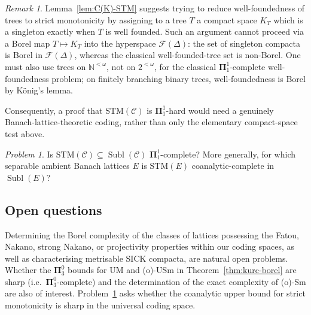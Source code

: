 \documentclass[12pt]{amsart}
\theoremstyle{plain}
\theoremstyle{definition}
\theoremstyle{remark}
\newtheorem{remark}[theorem]{Remark}
\newtheorem{problem}[theorem]{Problem}
\DeclareMathOperator{\Subl}{Subl}
\newcommand{\N}{\mathbb{N}}
\begin{document}
\begin{remark}\label{rem:STM-complete-caution}
Lemma~\ref{lem:C(K)-STM} suggests trying to reduce well-foundedness of trees to
strict monotonicity by assigning to a tree $T$ a compact space $K_T$ which is a
singleton exactly when $T$ is well founded.  Such an argument cannot proceed via
a Borel map $T\mapsto K_T$ into the hyperspace $\mathcal F(\Delta)$: the set of
singleton compacta is Borel in $\mathcal F(\Delta)$, whereas the classical
well-founded-tree set is non-Borel.  One must also use trees on
$\N^{<\omega}$, not on $2^{<\omega}$, for the classical
$\boldsymbol{\Pi}^1_1$-complete well-foundedness problem; on finitely branching
binary trees, well-foundedness is Borel by K\"onig's lemma.

Consequently, a proof that $\mathrm{STM}(\mathcal C)$ is
$\boldsymbol{\Pi}^1_1$-hard would need a genuinely Banach-lattice-theoretic
coding, rather than only the elementary compact-space test above.
\end{remark}

\begin{problem}\label{prob:STM-complete}
Is $\mathrm{STM}(\mathcal C)\subseteq\Subl(\mathcal C)$
$\boldsymbol{\Pi}^1_1$-complete?  More generally, for which separable ambient
Banach lattices $E$ is $\mathrm{STM}(E)$ coanalytic-complete in $\Subl(E)$?
\end{problem}

\subsection{Open questions}

Determining the Borel complexity of the classes of lattices possessing the Fatou,
Nakano, strong Nakano, or projectivity properties within our coding spaces, as
well as characterising metrisable SICK compacta, are natural open problems.
Whether the $\boldsymbol{\Pi}^0_3$ bounds for UM and (o)-USm in
Theorem~\ref{thm:kurc-borel} are sharp (i.e.\ $\boldsymbol{\Pi}^0_3$-complete)
and the determination of the exact complexity of (o)-Sm are also of interest.
Problem~\ref{prob:STM-complete} asks whether the coanalytic upper bound for
strict monotonicity is sharp in the universal coding space.
\end{document}
